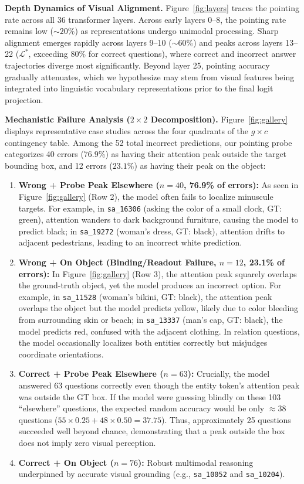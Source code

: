 \documentclass{article}
\begin{document}
\textbf{Depth Dynamics of Visual Alignment.}
Figure~\ref{fig:layers} traces the pointing rate across all 36 transformer layers. Across early layers 0--8, the pointing rate remains low ($\sim 20\%$) as representations undergo unimodal processing. Sharp alignment emerges rapidly across layers 9--10 ($\sim 60\%$) and peaks across layers 13--22 ($\mathcal{L}^*$, exceeding $80\%$ for correct questions), where correct and incorrect answer trajectories diverge most significantly. Beyond layer 25, pointing accuracy gradually attenuates, which we hypothesize may stem from visual features being integrated into linguistic vocabulary representations prior to the final logit projection.





\textbf{Mechanistic Failure Analysis ($2 \times 2$ Decomposition).}
Figure~\ref{fig:gallery} displays representative case studies across the four quadrants of the $g \times c$ contingency table. Among the 52 total incorrect predictions, our pointing probe categorizes 40 errors ($76.9\%$) as having their attention peak outside the target bounding box, and 12 errors ($23.1\%$) as having their peak on the object:
\begin{enumerate}
    \item \textbf{Wrong + Probe Peak Elsewhere ($n=40$, 76.9\% of errors):} As seen in Figure~\ref{fig:gallery} (Row 2), the model often fails to localize minuscule targets. For example, in \texttt{sa\_16306} (asking the color of a small clock, GT: green), attention wanders to dark background furniture, causing the model to predict black; in \texttt{sa\_19272} (woman's dress, GT: black), attention drifts to adjacent pedestrians, leading to an incorrect white prediction.
    \item \textbf{Wrong + On Object (Binding/Readout Failure, $n=12$, 23.1\% of errors):} In Figure~\ref{fig:gallery} (Row 3), the attention peak squarely overlaps the ground-truth object, yet the model produces an incorrect option. For example, in \texttt{sa\_11528} (woman's bikini, GT: black), the attention peak overlaps the object but the model predicts yellow, likely due to color bleeding from surrounding skin or beach; in \texttt{sa\_13337} (man's cap, GT: black), the model predicts red, confused with the adjacent clothing. In relation questions, the model occasionally localizes both entities correctly but misjudges coordinate orientations.
    \item \textbf{Correct + Probe Peak Elsewhere ($n=63$):} Crucially, the model answered 63 questions correctly even though the entity token's attention peak was outside the GT box. If the model were guessing blindly on these 103 ``elsewhere'' questions, the expected random accuracy would be only $\approx 38$ questions ($55 \times 0.25 + 48 \times 0.50 = 37.75$). Thus, approximately 25 questions succeeded well beyond chance, demonstrating that a peak outside the box does not imply zero visual perception.
    \item \textbf{Correct + On Object ($n=76$):} Robust multimodal reasoning underpinned by accurate visual grounding (e.g., \texttt{sa\_10052} and \texttt{sa\_10204}).
\end{enumerate}
\end{document}
